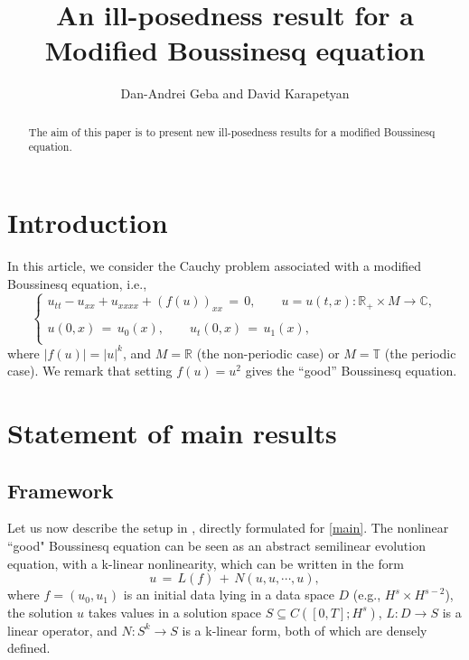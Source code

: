 \documentclass{amsart}
\begin{document}
\title{An ill-posedness result for a Modified Boussinesq equation}

\author{Dan-Andrei Geba and David Karapetyan}

\address{Department of Mathematics, University of Rochester, Rochester, NY 14627}
\address{Department of Mathematics, University of Rochester, Rochester, NY 14627}
\date{}

\begin{abstract}
The aim of this paper is to present new ill-posedness results for a modified Boussinesq equation. 
\end{abstract}


\maketitle

\section{Introduction}

In this article, we consider the Cauchy problem associated with a modified Boussinesq equation, i.e.,
\begin{equation}
\left\{
\begin{array}{l}
u_{tt}-u_{xx}+u_{xxxx}+(f(u))_{xx}\,=\,0, \qquad u=u(t,x): \mathbb{R}_+\times M \to \mathbb{C},\\
\\
u(0,x)\,=\,u_0(x),\qquad u_t(0,x)\,=\,u_1(x),\\
\end{array}\right.
\label{main}
\end{equation}
where $| f(u)| = |u|^{k}$, and $M=\mathbb{R}$ (the non-periodic case) or $M=\mathbb{T}$ (the periodic case). We remark that setting  $f(u) = u^{2}$ gives the ``good'' Boussinesq equation.

\section{Statement of main results}

\subsection{Framework} Let us now describe the setup in \cite{BT06}, directly formulated for \eqref{main}. The nonlinear ``good" Boussinesq equation can be seen as an abstract semilinear evolution equation, with a k-linear nonlinearity, which can be written in the form 
\begin{equation}
u\,=\,L(f)\,+\,N(u,u, \cdots, u),
\label{LN}
\end{equation}
where $f=(u_0, u_1)$ is an initial data lying in a data space $D$ (e.g., $H^s \times H^{s-2}$), the solution $u$ takes values in a solution space $S \subseteq	 C([0,T]; H^s)$, $L: D \to S$ is a linear operator, and $N:S^{k} \to S$ is a k-linear form, both of which are densely defined.  
\end{document}
